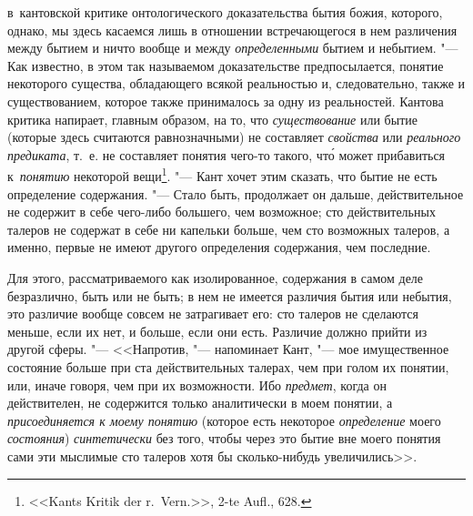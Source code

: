 в~кантовской критике онтологического доказательства бытия божия, которого,
однако, мы здесь касаемся лишь в отношении встречающегося в нем различения
между бытием и ничто вообще и между {\em определенными} бытием и небытием. "---
Как известно, в этом так называемом доказательстве предпосылается, понятие
некоторого существа, обладающего всякой реальностью и, следовательно, также и
существованием, которое также принималось за одну из реальностей. Кантова
критика напирает, главным образом, на то, что {\em существование} или бытие
(которые здесь считаются равнозначными) не составляет {\em свойства} или {\em
реального предиката}, т.~е. не составляет понятия чего-то такого, чт\'{о} может
прибавиться к~{\em понятию} некоторой вещи\footnote{<<Kants Kritik der
r.~Vern.>>, 2-te Aufl., 628.}. "--- Кант хочет этим сказать, что бытие не есть
определение содержания. "--- Стало быть, продолжает он дальше, действительное
не содержит в себе чего-либо большего, чем возможное; сто действительных
талеров не содержат в себе ни капельки больше, чем сто возможных талеров, а
именно, первые не имеют другого определения содержания, чем последние.

Для этого, рассматриваемого как изолированное, содержания в самом деле
безразлично, быть или не быть; в нем не имеется различия бытия или небытия, это
различие вообще совсем не затрагивает его: сто талеров не сделаются меньше,
если их нет, и больше, если они есть. Различие должно прийти из другой сферы.
"--- <<Напротив, "--- напоминает Кант, "--- мое имущественное состояние больше
при ста действительных талерах, чем при голом их понятии, или, иначе говоря,
чем при их возможности. Ибо {\em предмет}, когда он действителен, не содержится
только аналитически в моем понятии, а {\em присоединяется к моему понятию}
(которое есть некоторое {\em определение} моего {\em состояния})
{\em синтетически} без того, чтобы через это бытие вне моего понятия сами эти
мыслимые сто талеров хотя бы сколько-нибудь увеличились>>.


